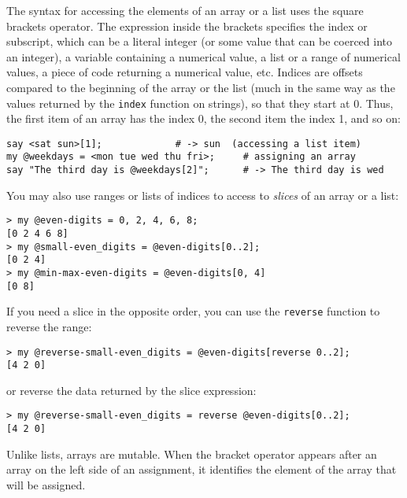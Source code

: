 The syntax for accessing the elements of an array or a list 
uses the square brackets operator.  The expression inside the 
brackets specifies the index or subscript, which can be a 
literal integer (or some value that can be coerced into 
an integer), a variable containing a numerical value, a list 
or a range of numerical values, a piece of code returning a 
numerical value, etc.  Indices are offsets compared to the beginning of the array 
or the list (much in the same way as the values returned 
by the {\tt index} function on strings), so that they start 
at 0. Thus, the first item of an array has the index 0, the 
second item the index 1, and so on:


\begin{verbatim}
say <sat sun>[1];             # -> sun  (accessing a list item)
my @weekdays = <mon tue wed thu fri>;     # assigning an array
say "The third day is @weekdays[2]";      # -> The third day is wed
\end{verbatim}
%

You may also use ranges or lists of indices to access to
\emph{slices} of an array or a list:

\begin{verbatim}
> my @even-digits = 0, 2, 4, 6, 8;
[0 2 4 6 8]
> my @small-even_digits = @even-digits[0..2];
[0 2 4]
> my @min-max-even-digits = @even-digits[0, 4]
[0 8]
\end{verbatim}

If you need a slice in the opposite order, you can use the 
{\tt reverse} function to reverse the range:

\begin{verbatim}
> my @reverse-small-even_digits = @even-digits[reverse 0..2];
[4 2 0]
\end{verbatim}

or reverse the data returned by the slice expression:

\begin{verbatim}
> my @reverse-small-even_digits = reverse @even-digits[0..2];
[4 2 0]
\end{verbatim}

Unlike lists, arrays are mutable.  When the bracket operator 
appears after an array on the left side of an assignment, 
it identifies the element of the array that will be assigned.

